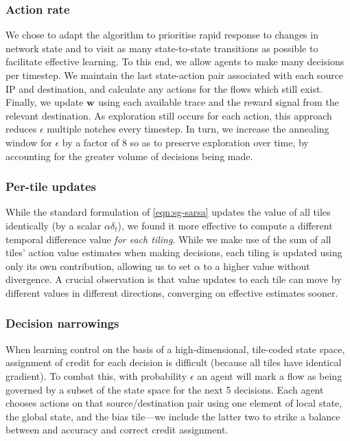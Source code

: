 \documentclass[10pt, times, comsoc]{IEEEtran}
\newcommand{\wvec}[1]{\ensuremath{\bm{w}_{#1}}}
\begin{document}
\subsubsection{Action rate}
We chose to adapt the algorithm to prioritise rapid response to changes in network state and to visit as many state-to-state transitions as possible to facilitate effective learning.
To this end, we allow agents to make many decisions per timestep.
We maintain the last state-action pair associated with each source IP and destination, and calculate any actions for the flows which still exist.
Finally, we update $\wvec{}$ using each available trace and the reward signal from the relevant destination.
As exploration still occurs for each action, this approach reduces $\epsilon$ multiple notches every timestep.
In turn, we increase the annealing window for $\epsilon$ by a factor of 8 so as to preserve exploration over time, by accounting for the greater volume of decisions being made.

\subsubsection{Per-tile updates}
While the standard formulation of \cref{eqn:sg-sarsa} updates the value of all tiles identically (by a scalar $\alpha \delta_t$), we found it more effective to compute a different temporal difference value \emph{for each tiling}.
While we make use of the sum of all tiles' action value estimates when making decisions, each tiling is updated using only its own contribution, allowing us to set $\alpha$ to a higher value without divergence.
A crucial observation is that value updates to each tile can move by different values in different directions, converging on effective estimates sooner.

\subsubsection{Decision narrowings}
When learning control on the basis of a high-dimensional, tile-coded state space, assignment of credit for each decision is difficult (because all tiles have identical gradient).
To combat this, with probability $\epsilon$ an agent will mark a flow as being governed by a subset of the state space for the next 5 decisions.
Each agent chooses actions on that source/destination pair using one element of local state, the global state, and the bias tile---we include the latter two to strike a balance between and accuracy and correct credit assignment.
\end{document}
